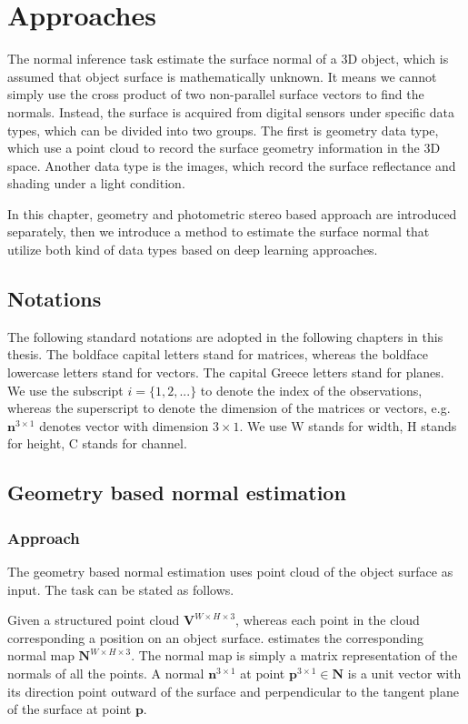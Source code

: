 \chapter{Approaches} %

\label{ch:03} %
The normal inference task estimate the surface normal of a 3D object, which is assumed that  object surface is mathematically unknown. It means we cannot simply use the cross product of two non-parallel surface vectors to find the normals. Instead, the surface is acquired from digital sensors under specific data types, which can be divided into two groups. The first is geometry data type, which use a point cloud to record the surface geometry information in the 3D space. 
Another data type is the images, which record the surface reflectance and shading under a light condition. 

In this chapter, geometry and photometric stereo based approach are introduced separately, then we introduce a method to estimate the surface normal that utilize both kind of data types based on deep learning approaches.

\section{Notations}

The following standard notations are adopted in the following chapters in this thesis. The boldface capital letters stand for matrices, whereas the boldface lowercase letters stand for vectors. The capital Greece letters stand for planes.
We use the subscript $ i= \{1,2,...\} $ to denote the index of the  observations, whereas the superscript to denote the dimension of the matrices or vectors, e.g. $ \textbf{n}^{3\times 1} $ denotes vector with  dimension $ 3\times1 $. We use W stands for width, H stands for height, C stands for channel.

\section{Geometry based normal estimation}

\subsection{Approach}
The geometry based normal estimation uses point cloud of the object surface as input. The task can be stated as follows.

Given a structured point cloud $ \textbf{V}^{W\times H\times 3} $, whereas each point in the cloud corresponding a position on an object surface. estimates the corresponding normal map  $ \textbf{N}^{W\times H \times 3} $. The normal map is simply a matrix representation of the normals of all the points. A normal  $ \textbf{n}^{3\times 1} $ at point   $ \textbf{p}^{3\times 1} \in \textbf{N} $ is a unit vector with its direction point outward of the surface and perpendicular to the tangent plane of the surface at point $ \textbf{p} $.


